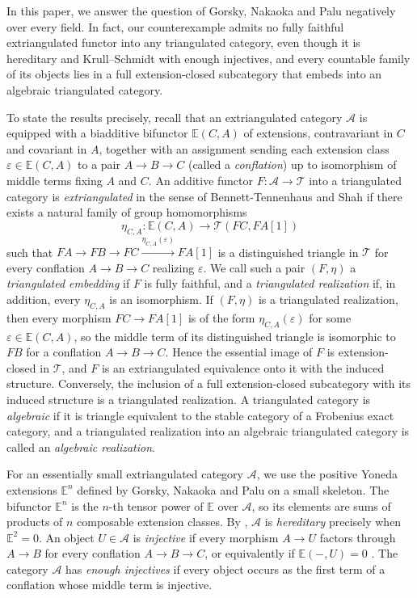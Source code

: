 \documentclass[a4paper,reqno,10pt]{amsart}
\numberwithin{equation}{section}
\theoremstyle{definition}
\newcommand{\E}{\mathbb E}
\newcommand{\T}{\mathcal T}
\begin{document}
In this paper, we answer the question of Gorsky, Nakaoka and Palu negatively
over every field. In fact, our counterexample admits no fully faithful
extriangulated functor into any triangulated category, even though it is
hereditary and Krull--Schmidt with enough injectives, and every countable
family of its objects lies in a full extension-closed subcategory that embeds
into an algebraic triangulated category.

To state the results precisely, recall that an extriangulated category
$\mathcal A$ is equipped with a biadditive bifunctor $\E(C,A)$ of extensions,
contravariant in $C$ and covariant in $A$, together with an assignment sending
each extension class $\varepsilon\in\E(C,A)$ to a pair $A\to B\to C$ (called a
\emph{conflation}) up to isomorphism of middle terms fixing $A$ and $C$. An additive functor
$F:\mathcal A\to\T$ into a triangulated category is \emph{extriangulated} in
the sense of Bennett-Tennenhaus and Shah \cite[Definition~2.32 with $n=1$]{BS}
if there exists a natural family of group homomorphisms
\[
  \eta_{C,A}:\E(C,A)\longrightarrow\T(FC,FA[1])
\]
such that $FA\to FB\to FC\xrightarrow{\eta_{C,A}(\varepsilon)}FA[1]$ is a
distinguished triangle in $\T$ for every conflation $A\to B\to C$ realizing
$\varepsilon$. We call such a pair $(F,\eta)$ a \emph{triangulated embedding}
if $F$ is fully faithful, and a \emph{triangulated realization} if, in
addition, every $\eta_{C,A}$ is an isomorphism. If $(F,\eta)$ is a triangulated
realization, then every morphism $FC\to FA[1]$ is of the form
$\eta_{C,A}(\varepsilon)$ for some $\varepsilon\in\E(C,A)$, so the middle term
of its distinguished triangle is isomorphic to $FB$ for a conflation
$A\to B\to C$. Hence the essential image of $F$ is extension-closed in $\T$,
and $F$ is an extriangulated equivalence onto it with the induced structure.
Conversely, the inclusion of a full extension-closed subcategory with its
induced structure is a triangulated realization. A triangulated category is
\emph{algebraic} if it is triangle equivalent to the stable category of a
Frobenius exact category, and a triangulated realization into an algebraic
triangulated category is called an \emph{algebraic realization}.

For an essentially small extriangulated category $\mathcal A$, we use the
positive Yoneda extensions $\E^n$ defined by Gorsky, Nakaoka and Palu
\cite[Definition~3.1 and Remarks~3.2--3.3]{GNP} on a small skeleton. The
bifunctor $\E^n$ is the $n$-th tensor power of $\E$ over $\mathcal A$, so its
elements are sums of products of $n$ composable extension classes. By
\cite[Proposition~2.1(1)(iii) and Definition~2.3]{GNP2}, $\mathcal A$ is
\emph{hereditary} precisely when $\E^2=0$. An object $U\in\mathcal A$ is
\emph{injective} if every morphism $A\to U$ factors through $A\to B$ for every
conflation $A\to B\to C$, or equivalently if $\E(-,U)=0$ \cite[dual of
Proposition~3.24]{NP}. The category $\mathcal A$ has \emph{enough injectives}
if every object occurs as the first term of a conflation whose middle term is
injective.
\end{document}
